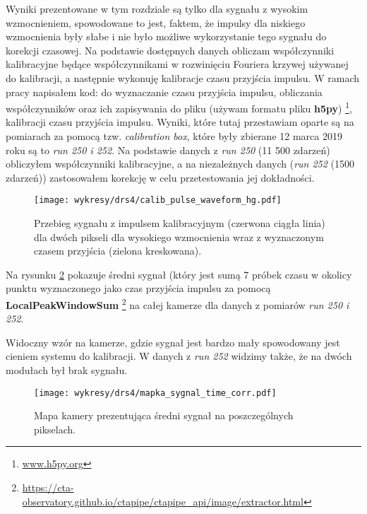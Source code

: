 \documentclass[a4paper,11pt,twoside]{article}
\begin{document}
 Wyniki prezentowane w tym rozdziale są tylko dla sygnału z wysokim wzmocnieniem, spowodowane to jest, faktem, że impulsy dla niskiego wzmocnienia były słabe i nie było możliwe wykorzystanie tego sygnału do korekcji czasowej.  Na podstawie dostępnych danych obliczam współczynniki kalibracyjne będące współczynnikami w rozwinięciu Fouriera krzywej używanej do kalibracji, a następnie wykonuję kalibracje czasu przyjścia impulsu. W ramach pracy napisałem kod: do wyznaczanie czasu przyjścia impulsu, obliczania współczynników oraz ich zapisywania do pliku (używam formatu pliku {\bf{h5py}}) \footnote{\url{www.h5py.org}}, kalibracji czasu przyjścia impulsu. Wyniki, które tutaj przestawiam oparte są na pomiarach za pomocą tzw. \textsl{calibration box}, które były zbierane 12 marca 2019 roku są to \textsl{run 250 i 252}. Na podstawie danych z \textsl{run 250} (11 500 zdarzeń) obliczyłem współczynniki kalibracyjne, a na niezależnych danych (\textsl{run 252} (1500 zdarzeń)) zastosowałem korekcję w celu przetestowania jej dokładności. 
\begin{figure}[H] 
\centering
\texttt{[image: wykresy/drs4/calib\_pulse\_waveform\_hg.pdf]}
\caption{Przebieg sygnału z impulsem kalibracyjnym (czerwona ciągła linia) dla dwóch pikseli dla wysokiego wzmocnienia wraz z wyznaczonym czasem przyjścia (zielona kreskowana).}
\label{fig:calib_waveform_hg}
\end{figure}
Na rysunku \ref{fig:signal_map} pokazuje średni sygnał (który jest sumą 7 próbek czasu w okolicy punktu wyznaczonego jako czas przyjścia impulsu za pomocą {\bf{LocalPeakWindowSum}} \footnote{\url{https://cta-observatory.github.io/ctapipe/ctapipe_api/image/extractor.html}} na całej kamerze dla danych z pomiarów \textsl{run 250 i 252}. 

Widoczny wzór na kamerze, gdzie sygnał jest bardzo mały spowodowany jest cieniem systemu do kalibracji. W danych z \textsl{run 252} widzimy także, że na dwóch modułach był brak sygnału.
\begin{figure}[H] 
\centering
\texttt{[image: wykresy/drs4/mapka\_sygnal\_time\_corr.pdf]}
\caption{Mapa kamery prezentująca średni sygnał na poszczególnych pikselach.}
\label{fig:signal_map}
\end{figure}
\newpage
\end{document}
